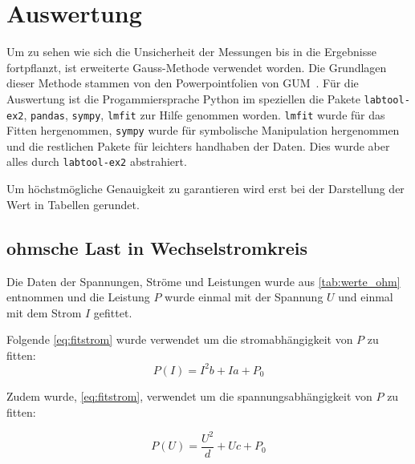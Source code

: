 \documentclass[12pt,english,ngerman]{scrartcl}
\begin{document}

\section{Auswertung}\label{sec:auswertung}

Um zu sehen wie sich die Unsicherheit der Messungen bis in die Ergebnisse
fortpflanzt, ist erweiterte Gauss-Methode verwendet worden. Die Grundlagen
dieser Methode stammen von den Powerpointfolien von
GUM~\cite{WolfgangKessel2004}. Für die Auswertung ist die Progammiersprache
Python im speziellen die Pakete \verb#labtool-ex2#, \verb#pandas#,
\verb#sympy#, \verb#lmfit# zur Hilfe genommen worden. \verb#lmfit# wurde für
das Fitten hergenommen, \verb#sympy# wurde für symbolische Manipulation
hergenommen und die restlichen Pakete für leichters handhaben der Daten. Dies
wurde aber alles durch \verb#labtool-ex2# abstrahiert.

Um höchstmögliche Genauigkeit zu garantieren wird erst bei der Darstellung der
Wert in Tabellen gerundet.

\subsection{ohmsche Last in Wechselstromkreis}
Die Daten der Spannungen, Ströme und Leistungen wurde aus
\autoref{tab:werte_ohm} entnommen und die Leistung $P$ wurde einmal mit der
Spannung $U$ und einmal mit dem Strom $I$ gefittet.

Folgende \autoref{eq:fitstrom} wurde verwendet um die stromabhängigkeit von $P$
zu fitten:
\begin{equation}
	P(I) = I^{2} b + I a + P_0
	\label{eq:fitstrom}
\end{equation}

Zudem wurde, \autoref{eq:fitstrom}, verwendet um die spannungsabhängigkeit von
$P$ zu fitten:

\begin{equation}
	P(U) = \frac{U^{2}}{d} + U c + P_0
	\label{eq:fitspannung}
\end{equation}
\end{document}

